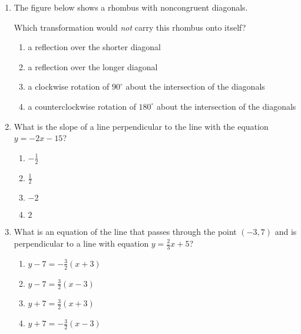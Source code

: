\documentclass[12pt, twoside]{article}
\begin{document}
\begin{enumerate}
\item The figure below shows a rhombus with noncongruent diagonals.
  \begin{center}
  \end{center}
  Which transformation would \emph{not} carry this rhombus onto itself?
    \begin{enumerate}
      \item a reflection over the shorter diagonal
      \item a reflection over the longer diagonal
      \item a clockwise rotation of $90^\circ$ about the intersection of the
      diagonals
      \item a counterclockwise rotation of $180^\circ$ about the intersection of the
      diagonals
    \end{enumerate}
  
\item What is the slope of a line perpendicular to the line with the equation $y=-2x-15$?
  \begin{multicols}{2}
    \begin{enumerate}
      \item $-\frac{1}{2}$
      \item $\frac{1}{2}$ 
      \item $-2$
      \item $2$
    \end{enumerate}
  \end{multicols}

\item What is an equation of the line that passes through the point $(-3,7)$ and is perpendicular to a line with equation $y=\frac{2}{3}x+5$?
  \begin{multicols}{2}
    \begin{enumerate}
      \item $y-7=-\frac{3}{2}(x+3)$
      \item $y-7=\frac{3}{2}(x-3)$ 
      \item $y+7=\frac{3}{2}(x+3)$
      \item $y+7=-\frac{3}{2}(x-3)$
    \end{enumerate}
  \end{multicols}


\end{enumerate}
\end{document}
